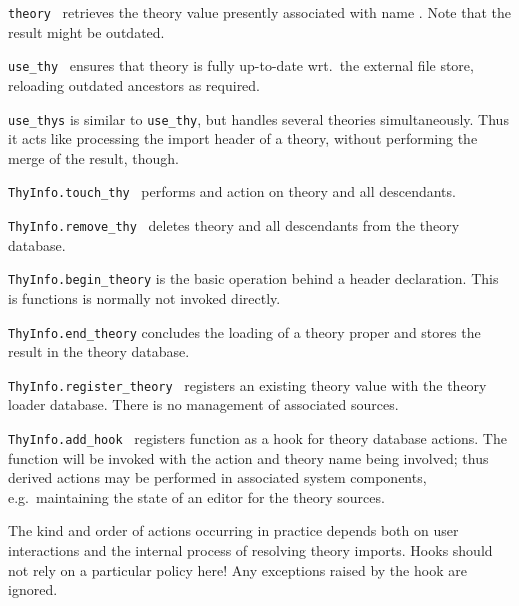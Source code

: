 \begin{isabellebody}
\begin{isamarkuptext}
  \begin{description}

  \item \verb|theory|~ retrieves the theory value presently
  associated with name .  Note that the result might be
  outdated.

  \item \verb|use_thy|~ ensures that theory  is fully
  up-to-date wrt.\ the external file store, reloading outdated
  ancestors as required.

  \item \verb|use_thys| is similar to \verb|use_thy|, but handles
  several theories simultaneously.  Thus it acts like processing the
  import header of a theory, without performing the merge of the
  result, though.

  \item \verb|ThyInfo.touch_thy|~ performs and  action
  on theory  and all descendants.

  \item \verb|ThyInfo.remove_thy|~ deletes theory  and all
  descendants from the theory database.

  \item \verb|ThyInfo.begin_theory| is the basic operation behind a
  \isa{{\isasymTHEORY}} header declaration.  This is {\ML} functions is
  normally not invoked directly.

  \item \verb|ThyInfo.end_theory| concludes the loading of a theory
  proper and stores the result in the theory database.

  \item \verb|ThyInfo.register_theory|~ registers an
  existing theory value with the theory loader database.  There is no
  management of associated sources.

  \item \verb|ThyInfo.add_hook|~ registers function  as a hook for theory database actions.  The function will be
  invoked with the action and theory name being involved; thus derived
  actions may be performed in associated system components, e.g.\
  maintaining the state of an editor for the theory sources.

  The kind and order of actions occurring in practice depends both on
  user interactions and the internal process of resolving theory
  imports.  Hooks should not rely on a particular policy here!  Any
  exceptions raised by the hook are ignored.

  \end{description}%
\end{isamarkuptext}%
\isamarkuptrue%
%
\endisatagmlref
{\isafoldmlref}%
%
\isadelimmlref
%
\endisadelimmlref
%
\isadelimtheory
%
\endisadelimtheory
%
\isatagtheory
{}\isamarkupfalse%
%
\endisatagtheory
{\isafoldtheory}%
%
\isadelimtheory
%
\endisadelimtheory
\isanewline
\end{isabellebody}%
